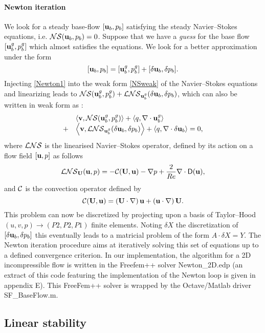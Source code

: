 \documentclass[twocolumn,10pt]{asme2ej}
\newcommand{\be}[1]{ \begin{equation} \label{#1}}
\newcommand{\ee}{\end{equation}}
\newcommand{\bes}[1]{ \begin{equation} \label{#1}\begin{array}{rl}}
\newcommand{\ees}{\end{array}\end{equation}}
\begin{document}
\paragraph{Newton iteration}


We look for a steady base-flow $[{\bf u}_b,p_b]$ satisfying the steady Navier--Stokes equations, i.e. 
${\cal NS} ({\bf u}_b,p_b) = 0$.
Suppose that we have a {\em guess}  for the base flow $[{\bf u}_b^g,p_b^g]$  which almost satisfies the equations. 
We look for a better approximation under the form
\be{Newton1}
[{\bf u}_b,p_b]  = [{\bf u}_b^g,p_b^g] + [\delta {\bf u}_b, \delta p_b].
\ee
Injecting \eqref{Newton1} into the weak form \eqref{NSweak} of the Navier--Stokes equations and linearizing leads to  
${\cal NS}  ({\bf u}_b^g,p_b^g) +  {\cal LNS} _{{\bf u}_b^g}(\delta {\bf u}_b,\delta p_b)$, which can also be written in weak form as :
\bes{Newton2}
&\left< {\bf v}, {\cal NS} ({\bf u}_b^g,p_b^g)\right> + \left<q, \nabla \cdot {\bf u}_b^g\right>  
\\
+ &\left< { \bf v}, {\cal LNS} _{{\bf u}_b^g}( \delta {\bf u}_b,\delta p_b) \right> + \left<q, \nabla \cdot \delta{\bf u}_b\right> = 0,
\ees
where ${\cal LNS}$ is the linearised Navier--Stokes operator, defined by its action on a flow field $[{\bf u} , p]$ as follows 
\be{defNSL}
 {\cal LNS}_{{\bf U}}( {\bf u}, p) = - {\cal C}( {\bf U} , {\bf u}) -\nabla p
+\frac{2}{Re} \nabla  \cdot {\mathsf{D}}({\bf u}), %
 \ee
and ${\cal C}$ is the convection operator defined by 
\be{defC}
{\cal C}( {\bf U} , {\bf u}) = \left( {\bf U} \cdot \nabla \right) {\bf u} + \left( {\bf u} \cdot \nabla \right)  {\bf U}.
\ee
This problem can now be discretized by projecting upon a basis of Taylor--Hood $(u,v,p) \rightarrow (P2,P2,P1)$ finite elements. Noting $\delta X$ the discretization of $[\delta {\bf u}_b,\delta p_b]$ this eventually leads to a matricial problem of the form $A \cdot \delta X = Y$. The Newton iteration procedure aims at iteratively solving this set of equations up to a defined convergence criterion.
In our implementation, the algorithm for a 2D incompressible flow is written in the Freefem++ solver {\sf Newton\_2D.edp} (an extract of this code featuring the implementation of the Newton loop is given in appendix E). This FreeFem++ solver is wrapped by the Octave/Matlab driver {\sf SF\_BaseFlow.m}.

\subsection{Linear stability}
\vspace{.2cm}
\end{document}
